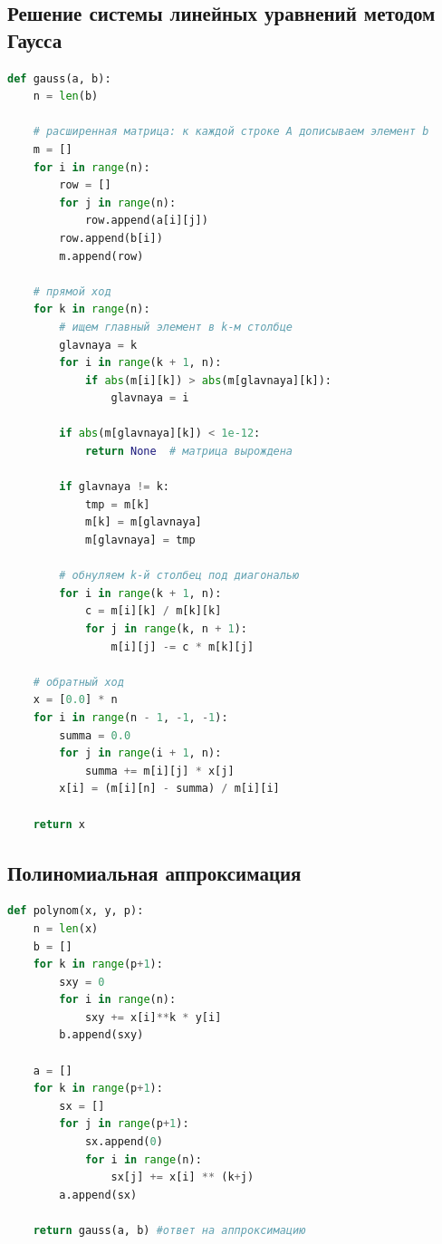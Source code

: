 \documentclass[12pt,a4paper]{article}
\begin{document}
\subsection*{Решение системы линейных уравнений методом Гаусса}
\begin{lstlisting}[language=Python,caption={Функция \texttt{gauss}}]
def gauss(a, b):
    n = len(b)

    # расширенная матрица: к каждой строке A дописываем элемент b
    m = []
    for i in range(n):
        row = []
        for j in range(n):
            row.append(a[i][j])
        row.append(b[i])
        m.append(row)

    # прямой ход
    for k in range(n):
        # ищем главный элемент в k-м столбце
        glavnaya = k
        for i in range(k + 1, n):
            if abs(m[i][k]) > abs(m[glavnaya][k]):
                glavnaya = i

        if abs(m[glavnaya][k]) < 1e-12:
            return None  # матрица вырождена

        if glavnaya != k:
            tmp = m[k]
            m[k] = m[glavnaya]
            m[glavnaya] = tmp

        # обнуляем k-й столбец под диагональю
        for i in range(k + 1, n):
            c = m[i][k] / m[k][k]
            for j in range(k, n + 1):
                m[i][j] -= c * m[k][j]

    # обратный ход
    x = [0.0] * n
    for i in range(n - 1, -1, -1):
        summa = 0.0
        for j in range(i + 1, n):
            summa += m[i][j] * x[j]
        x[i] = (m[i][n] - summa) / m[i][i]

    return x
\end{lstlisting}

\subsection*{Полиномиальная аппроксимация}
\begin{lstlisting}[language=Python,caption={Функция \texttt{polynom}}]
def polynom(x, y, p):
    n = len(x)
    b = []
    for k in range(p+1):
        sxy = 0
        for i in range(n):
            sxy += x[i]**k * y[i]
        b.append(sxy)

    a = []
    for k in range(p+1):
        sx = []
        for j in range(p+1):
            sx.append(0)
            for i in range(n):
                sx[j] += x[i] ** (k+j)
        a.append(sx)

    return gauss(a, b) #ответ на аппроксимацию
\end{lstlisting}
\end{document}
